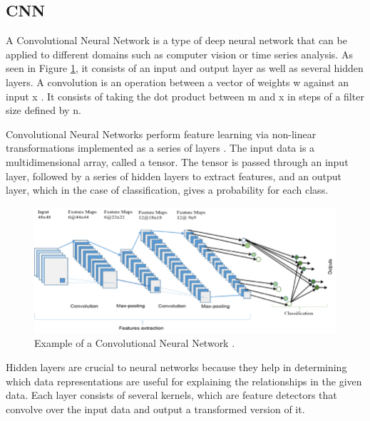 \documentclass{turabian-thesis}[12pt]
\begin{document}
\subsection{CNN}

A Convolutional Neural Network is a type of deep neural network that can be applied to different domains such as computer vision or time series analysis. As seen in Figure \ref{fig:cnn_example}, it consists of an input and output layer as well as several hidden layers. A convolution is an operation between a vector of weights w against an input x \cite{yamashita_convolutional_2018}. It consists of taking the dot product between m and x in steps of a filter size defined by n.

Convolutional Neural Networks perform feature learning via non-linear transformations implemented as a series of layers \cite{aqib_smarter_2019}. The input data is a multidimensional array, called a tensor. The tensor is passed through an input layer, followed by a series of hidden layers to extract features, and an output layer, which in the case of classification, gives a probability for each class. 

\begin{figure}[h!]
   \begin{center}
      \includegraphics[scale=0.5]{../media/cnn_example.png}
   \end{center}
   \caption{Example of a Convolutional Neural Network \cite{alom_state---art_2019}.}
   \label{fig:cnn_example}
\end{figure}

Hidden layers are crucial to neural networks because they help in determining which data representations are useful for explaining the relationships in the given data. Each layer consists of several kernels,  which are feature detectors that convolve over the input data and output a transformed version of it. 
\end{document}
